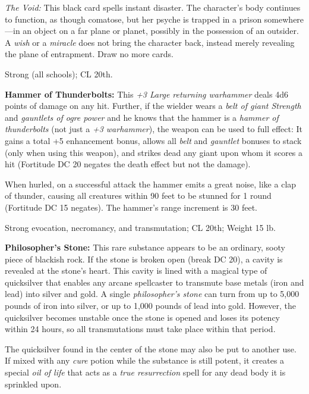 \textit{The Void: }This black card spells instant disaster. The character's body 
continues to function, as though comatose, but her psyche is trapped in a prison 
somewhere---in an object on a far plane or planet, possibly in the possession of 
an outsider. A \textit{wish }or a \textit{miracle }does not bring the character 
back, instead merely revealing the plane of entrapment. Draw no more cards.

Strong (all schools); CL 20th.

\vspace{12pt}
\textbf{Hammer of Thunderbolts:} This \textit{+3 Large returning warhammer }deals 
4d6 points of damage on any hit. Further, if the wielder wears a \textit{belt of 
giant Strength }and \textit{gauntlets of ogre power }and he knows that the hammer 
is a \textit{hammer of thunderbolts }(not just a \textit{+3 warhammer}), the weapon 
can be used to full effect: It gains a total +5 enhancement bonus, allows all \textit{belt 
}and \textit{gauntlet }bonuses to stack (only when using this weapon), and strikes 
dead any giant upon whom it scores a hit (Fortitude DC 20 negates the death effect 
but not the damage).

When hurled, on a successful attack the hammer emits a great noise, like a clap 
of thunder, causing all creatures within 90 feet to be stunned for 1 round (Fortitude 
DC 15 negates). The hammer's range increment is 30 feet.

Strong evocation, necromancy, and transmutation; CL 20th; Weight 15 lb.

\vspace{12pt}
\textbf{Philosopher's Stone:} This rare substance appears to be an ordinary, sooty 
piece of blackish rock. If the stone is broken open (break DC 20), a cavity is 
revealed at the stone's heart. This cavity is lined with a magical type of quicksilver 
that enables any arcane spellcaster to transmute base metals (iron and lead) into 
silver and gold. A single \textit{philosopher's stone }can turn from up to 5,000 
pounds of iron into silver, or up to 1,000 pounds of lead into gold. However, the 
quicksilver becomes unstable once the stone is opened and loses its potency within 
24 hours, so all transmutations must take place within that period.

The quicksilver found in the center of the stone may also be put to another use. 
If mixed with any \textit{cure }potion while the substance is still potent, it 
creates a special \textit{oil of life }that acts as a \textit{true resurrection 
}spell for any dead body it is sprinkled upon.

